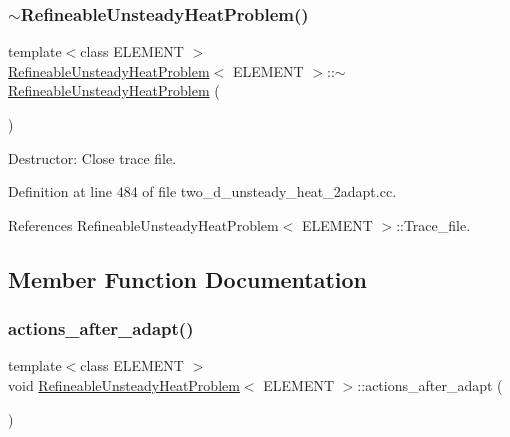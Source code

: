 \subsubsection{\texorpdfstring{$\sim$\+Refineable\+Unsteady\+Heat\+Problem()}{~RefineableUnsteadyHeatProblem()}}
{\footnotesize\ttfamily template$<$class E\+L\+E\+M\+E\+NT $>$ \\
\hyperlink{classRefineableUnsteadyHeatProblem}{Refineable\+Unsteady\+Heat\+Problem}$<$ E\+L\+E\+M\+E\+NT $>$\+::$\sim$\hyperlink{classRefineableUnsteadyHeatProblem}{Refineable\+Unsteady\+Heat\+Problem} (\begin{DoxyParamCaption}{ }\end{DoxyParamCaption})}



Destructor\+: Close trace file. 



Definition at line 484 of file two\+\_\+d\+\_\+unsteady\+\_\+heat\+\_\+2adapt.\+cc.



References Refineable\+Unsteady\+Heat\+Problem$<$ E\+L\+E\+M\+E\+N\+T $>$\+::\+Trace\+\_\+file.



\subsection{Member Function Documentation}
\mbox{\label{classRefineableUnsteadyHeatProblem_a1f8a9e91269440c799a2075f989d62b1}} 
\subsubsection{\texorpdfstring{actions\+\_\+after\+\_\+adapt()}{actions\_after\_adapt()}}
{\footnotesize\ttfamily template$<$class E\+L\+E\+M\+E\+NT $>$ \\
void \hyperlink{classRefineableUnsteadyHeatProblem}{Refineable\+Unsteady\+Heat\+Problem}$<$ E\+L\+E\+M\+E\+NT $>$\+::actions\+\_\+after\+\_\+adapt (\begin{DoxyParamCaption}{ }\end{DoxyParamCaption})}



